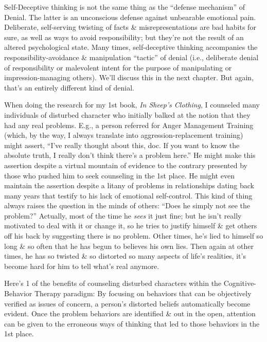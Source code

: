 \documentclass{article}
\numberwithin{equation}{section}
\begin{document}
Self-Deceptive thinking is not the same thing as the ``defense mechanism'' of Denial. The latter is an unconscious defense against unbearable emotional pain. Deliberate, self-serving twisting of facts \& misrepresentations are bad habits for sure, as well as ways to avoid responsibility; but they're not the result of an altered psychological state. Many times, self-deceptive thinking accompanies the responsibility-avoidance \& manipulation ``tactic'' of denial (i.e., deliberate denial of responsibility or malevolent intent for the purpose of manipulating or impression-managing others). We'll discuss this in the next chapter. But again, that's an entirely different kind of denial.

When doing the research for my 1st book, \textit{In Sheep's Clothing}, I counseled many individuals of disturbed character who initially balked at the notion that they had any real problems. E.g., a person referred for Anger Management Training (which, by the way, I always translate into aggression-replacement training) might assert, ``I've really thought about this, doc. If you want to know the absolute truth, I really don't think there's a problem here.'' He might make this assertion despite a virtual mountain of evidence to the contrary presented by those who pushed him to seek counseling in the 1st place. He might even maintain the assertion despite a litany of problems in relationships dating back many years that testify to his lack of emotional self-control. This kind of thing always raises the question in the minds of others: ``Does he simply not see the problem?'' Actually, most of the time he \textit{sees} it just fine; but he isn't really motivated to deal with it or change it, so he tries to justify himself \& get others off his back by suggesting there is no problem. Other times, he's lied to himself so long \& so often that he has begun to believes his own lies. Then again at other times, he has so twisted \& so distorted so many aspects of life's realities, it's become hard for him to tell what's real anymore.

Here's 1 of the benefits of counseling disturbed characters within the Cognitive-Behavior Therapy paradigm: By focusing on behaviors that can be objectively verified as issues of concern, a person's distorted beliefs automatically become evident. Once the problem behaviors are identified \& out in the open, attention can be given to the erroneous ways of thinking that led to those behaviors in the 1st place.
\end{document}
